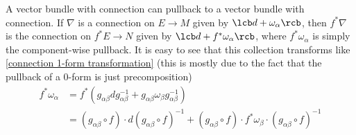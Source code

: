 A vector bundle with connection can pullback to a vector bundle with connection. If $\nabla$ is a connection on $E \rightarrow M$ given by $\lcb d + \omega_\alpha \rcb$, then $f^*\nabla$ is the connection on $f^*E \rightarrow N$ given by $\lcb d + f^*\omega_\alpha \rcb$, where $f^*\omega_\alpha$ is simply the component-wise pullback. It is easy to see that this collection transforms like \eqref{connection 1-form transformation} (this is mostly due to the fact that the pullback of a 0-form is just precomposition)
\begin{align*}
	f^*\omega_\alpha &= f^* \left( g_{\alpha\beta} dg_{\alpha\beta}^{-1} + g_{\alpha\beta} \omega_\beta g_{\alpha\beta}^{-1} \right) \\
	                 &= (g_{\alpha\beta} \circ f) \cdot d(g_{\alpha\beta} \circ f)^{-1} + (g_{\alpha\beta} \circ f) \cdot f^*\omega_\beta \cdot (g_{\alpha\beta} \circ f)^{-1}
\end{align*}

